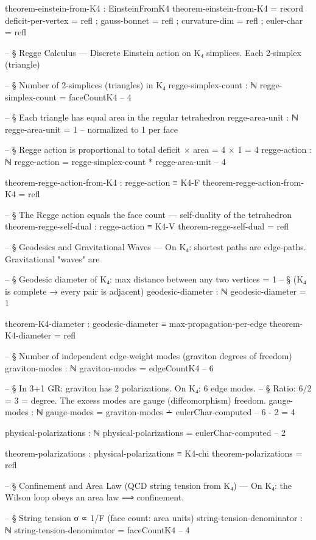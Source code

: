 \documentclass[11pt,a4paper]{book}
\begin{document}
\begin{code}
theorem-einstein-from-K4 : EinsteinFromK4
theorem-einstein-from-K4 = record
  { deficit-per-vertex = refl
  ; gauss-bonnet = refl
  ; curvature-dim = refl
  ; euler-char = refl }

-- § Regge Calculus — Discrete Einstein action on K₄ simplices. Each 2-simplex (triangle)

-- § Number of 2-simplices (triangles) in K₄
regge-simplex-count : ℕ
regge-simplex-count = faceCountK4  -- 4

-- § Each triangle has equal area in the regular tetrahedron
regge-area-unit : ℕ
regge-area-unit = 1  -- normalized to 1 per face

-- § Regge action is proportional to total deficit × area = 4 × 1 = 4
regge-action : ℕ
regge-action = regge-simplex-count * regge-area-unit  -- 4

theorem-regge-action-from-K4 : regge-action ≡ K4-F
theorem-regge-action-from-K4 = refl

-- § The Regge action equals the face count — self-duality of the tetrahedron
theorem-regge-self-dual : regge-action ≡ K4-V
theorem-regge-self-dual = refl

-- § Geodesics and Gravitational Waves — On K₄: shortest paths are edge-paths. Gravitational "waves" are

-- § Geodesic diameter of K₄: max distance between any two vertices = 1
-- § (K₄ is complete → every pair is adjacent)
geodesic-diameter : ℕ
geodesic-diameter = 1

theorem-K4-diameter : geodesic-diameter ≡ max-propagation-per-edge
theorem-K4-diameter = refl

-- § Number of independent edge-weight modes (graviton degrees of freedom)
graviton-modes : ℕ
graviton-modes = edgeCountK4  -- 6

-- § In 3+1 GR: graviton has 2 polarizations. On K₄: 6 edge modes.
-- § Ratio: 6/2 = 3 = degree. The excess modes are gauge (diffeomorphism) freedom.
gauge-modes : ℕ
gauge-modes = graviton-modes ∸ eulerChar-computed  -- 6 - 2 = 4

physical-polarizations : ℕ
physical-polarizations = eulerChar-computed  -- 2

theorem-polarizations : physical-polarizations ≡ K4-chi
theorem-polarizations = refl

-- § Confinement and Area Law (QCD string tension from K₄) — On K₄: the Wilson loop obeys an area law ⟹ confinement.

-- § String tension σ ∝ 1/F (face count: area units)
string-tension-denominator : ℕ
string-tension-denominator = faceCountK4  -- 4


\end{code}
\end{document}

